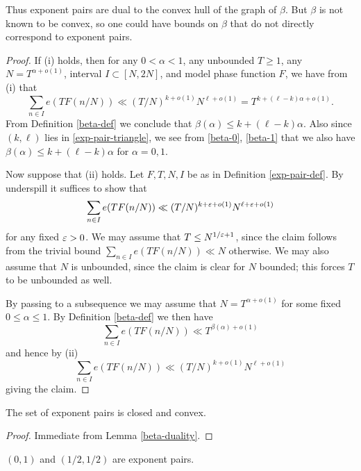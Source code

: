 
Thus exponent pairs are dual to the convex hull of the graph of $\beta$.  But $\beta$ is not known to be convex, so one could have bounds on $\beta$ that do not directly correspond to exponent pairs.

\begin{proof}  If (i) holds, then for any $0 < \alpha < 1$, any unbounded $T \geq 1$, any $N = T^{\alpha+o(1)}$, interval $I \subset [N,2N]$, and model phase function $F$, we have from (i) that
$$ \sum_{n \in I} e(T F(n/N)) \ll (T/N)^{k+o(1)} N^{\ell+o(1)} = T^{k + (\ell-k)\alpha + o(1)}.$$
From Definition \ref{beta-def} we conclude that $\beta(\alpha) \leq k + (\ell-k) \alpha$.  Also since $(k,\ell)$ lies in \eqref{exp-pair-triangle}, we see from \eqref{beta-0}, \eqref{beta-1} that we also have $\beta(\alpha) \leq k + (\ell-k) \alpha$ for $\alpha=0,1$.

Now suppose that (ii) holds.  Let $F, T, N, I$ be as in Definition \ref{exp-pair-def}.  By underspill it suffices to show that
$$ \sum_{n \in I} e(T F(n/N)) \ll (T/N)^{k+\varepsilon+o(1)} N^{\ell+\varepsilon+o(1)}$$
for any fixed $\varepsilon>0$.  We may assume that $T \leq N^{1/\varepsilon+1}$, since the claim follows from the trivial bound $\sum_{n \in I} e(T F(n/N)) \ll N$ otherwise.  We may also assume that $N$ is unbounded, since the claim is clear for $N$ bounded; this forces $T$ to be unbounded as well.

By passing to a subsequence we may assume that $N = T^{\alpha+o(1)}$ for some fixed $0 \leq \alpha \leq 1$.  By Definition \ref{beta-def} we then have
$$ \sum_{n \in I} e(T F(n/N)) \ll T^{\beta(\alpha)+o(1)}$$
and hence by (ii)
$$ \sum_{n \in I} e(T F(n/N)) \ll (T/N)^{k+o(1)} N^{\ell+o(1)}$$
giving the claim.
\end{proof}


\begin{corollary}\label{exp-pair-closed} The set of exponent pairs is closed and convex.
\end{corollary}

\begin{proof} Immediate from Lemma \ref{beta-duality}.
\end{proof}

\begin{proposition}\label{exp-pair-trivial}  $(0,1)$ and $(1/2,1/2)$ are exponent pairs.
\end{proposition}

